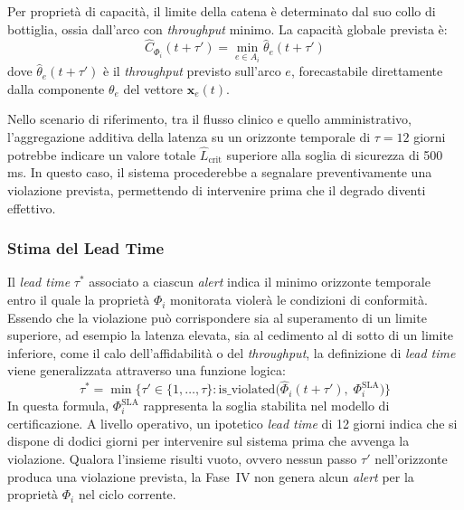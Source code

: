 Per proprietà di capacità, il limite della catena è determinato dal suo collo
di bottiglia, ossia dall'arco con \textit{throughput} minimo. La capacità globale prevista è:
\begin{equation}
\label{eq:agg_capacity}
\hat{C}_{\Phi_i}(t+\tau') = \min_{e \in A_i} \hat{\theta}_e(t+\tau')
\end{equation}
dove $\hat{\theta}_e(t+\tau')$ è il \textit{throughput} previsto sull'arco $e$, forecastabile
direttamente dalla componente $\theta_e$ del vettore $\mathbf{x}_e(t)$.

Nello scenario di riferimento, tra il flusso clinico e quello amministrativo, l'aggregazione
additiva della latenza su un orizzonte temporale di $\tau = 12$ giorni potrebbe indicare un valore
totale $\hat{L}_{\text{crit}}$ superiore alla soglia di sicurezza di 500\,ms. In questo
caso, il sistema procederebbe a segnalare preventivamente una violazione prevista, permettendo di
intervenire prima che il degrado diventi effettivo.

\subsubsection{Stima del Lead Time}
\label{sec:stima_lead_time}

Il \textit{lead time} $\tau^*$ associato a ciascun \textit{alert} indica il minimo
orizzonte temporale entro il quale la proprietà $\Phi_i$ monitorata violerà le condizioni di conformità.
Essendo che la violazione può corrispondere sia al superamento di un limite superiore, ad esempio la
latenza elevata, sia al cedimento al di sotto di un limite inferiore, come il calo dell'affidabilità
o del \textit{throughput}, la definizione di \textit{lead time} viene generalizzata attraverso una
funzione logica:
\begin{equation}
\label{eq:lead_time}
\tau^* = \min\bigl\{\tau' \in \{1, \ldots, \tau\} : 
  \mathrm{is\_violated}\bigl(\hat{\Phi}_i(t+\tau'),\; \Phi_i^{\text{SLA}}\bigr)\bigr\}
\end{equation}
In questa formula, $\Phi_i^{\text{SLA}}$ rappresenta la soglia stabilita nel modello di
certificazione. A livello operativo, un ipotetico \textit{lead time} di 12 giorni indica che si
dispone di dodici giorni per intervenire sul sistema prima che avvenga la violazione.
Qualora l'insieme risulti vuoto, ovvero nessun passo $\tau'$ nell'orizzonte 
produca una violazione prevista, la Fase~IV non genera alcun \textit{alert} 
per la proprietà $\Phi_i$ nel ciclo corrente.

